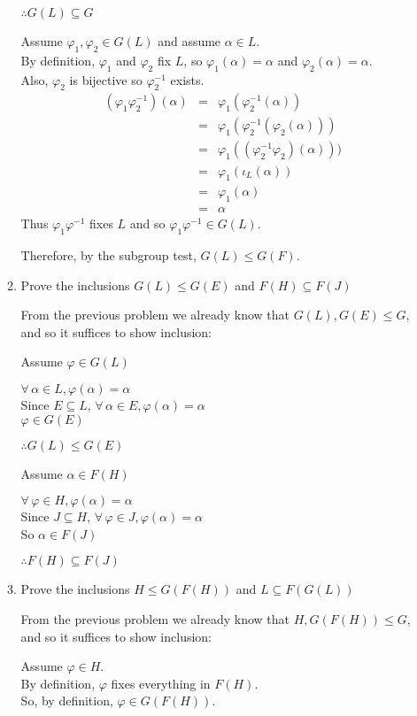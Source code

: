 \documentclass[letterpaper,12pt,fleqn]{article}
\newcommand{\vp}{\varphi}
\renewcommand{\a}{\alpha}
\renewcommand{\i}{\iota}
\renewcommand{\a}{\alpha}
\begin{document}
\begin{enumerate}
\begin{enumerate}
    $\therefore G(L)\subseteq G$

    Assume $\vp_1,\vp_2\in G(L)$ and assume $\a\in L$. \\
    By definition, $\vp_1$ and $\vp_2$ fix $L$, so $\vp_1(\a)=\a$ and
    $\vp_2(\a)=\a$. \\
    Also, $\vp_2$ is bijective so $\vp_2^{-1}$ exists.
    \begin{eqnarray*}
      (\vp_1\vp_2^{-1})(\a) &=& \vp_1(\vp_2^{-1}(\a)) \\
      &=& \vp_1(\vp_2^{-1}(\vp_2(\a))) \\
      &=& \vp_1((\vp_2^{-1}\vp_2)(\a))) \\
      &=& \vp_1(\i_L(\a)) \\
      &=& \vp_1(\a) \\
      &=& \a
    \end{eqnarray*}
    Thus $\vp_1\vp^{-1}$ fixes $L$ and so $\vp_1\vp^{-1}\in G(L)$.

    Therefore, by the subgroup test, $G(L)\le G(F)$.

  \item Prove the inclusions $G(L)\le G(E)$ and $F(H)\subseteq F(J)$

    From the previous problem we already know that $G(L),G(E)\le G$, and so it
    suffices to show inclusion:

    Assume $\vp\in G(L)$

    $\forall\,\a\in L,\vp(\a)=\a$ \\
    Since $E\subseteq L$, $\forall\,\a\in E,\vp(\a)=\a$ \\
    $\vp\in G(E)$
    
    $\therefore G(L)\le G(E)$

    Assume $\a\in F(H)$

    $\forall\,\vp\in H,\vp(\a)=\a$ \\
    Since $J\subseteq H$, $\forall\,\vp\in J,\vp(\a)=\a$ \\
    So $\a\in F(J)$

    $\therefore F(H)\subseteq F(J)$

  \item Prove the inclusions $H\le G(F(H))$ and $L\subseteq F(G(L))$

    From the previous problem we already know that $H,G(F(H))\le G$, and so it
    suffices to show inclusion:

    Assume $\vp\in H$. \\
    By definition, $\vp$ fixes everything in $F(H)$. \\
    So, by definition, $\vp\in G(F(H))$.


\end{enumerate}
\end{enumerate}
\end{document}
